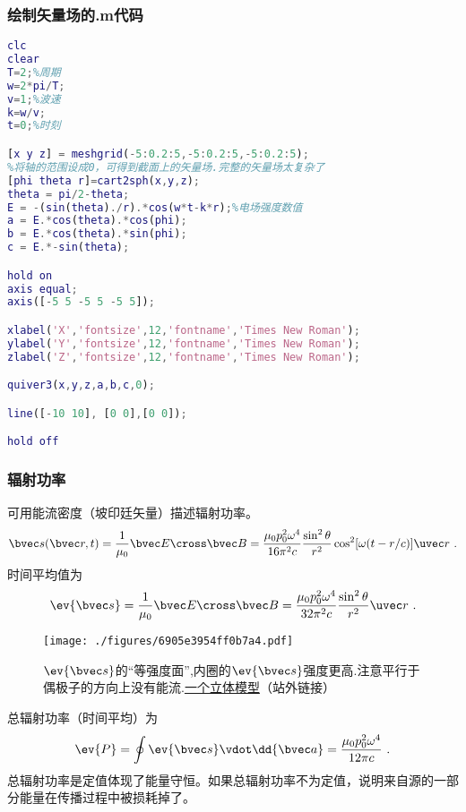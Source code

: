 \subsubsection{绘制矢量场的.m代码}
\begin{lstlisting}[language=matlab]
clc
clear
T=2;%周期
w=2*pi/T;
v=1;%波速
k=w/v;
t=0;%时刻

[x y z] = meshgrid(-5:0.2:5,-5:0.2:5,-5:0.2:5);
%将轴的范围设成0，可得到截面上的矢量场.完整的矢量场太复杂了
[phi theta r]=cart2sph(x,y,z);
theta = pi/2-theta;
E = -(sin(theta)./r).*cos(w*t-k*r);%电场强度数值
a = E.*cos(theta).*cos(phi);
b = E.*cos(theta).*sin(phi);
c = E.*-sin(theta);

hold on
axis equal;
axis([-5 5 -5 5 -5 5]);

xlabel('X','fontsize',12,'fontname','Times New Roman');
ylabel('Y','fontsize',12,'fontname','Times New Roman');
zlabel('Z','fontsize',12,'fontname','Times New Roman');

quiver3(x,y,z,a,b,c,0);

line([-10 10], [0 0],[0 0]);

hold off

\end{lstlisting}


\subsubsection{辐射功率}
可用能流密度（坡印廷矢量）描述辐射功率。
\begin{equation}
\bvec s(\bvec r, t) = \frac{1}{\mu_0} \bvec E \cross \bvec B = \frac{\mu_0p_0^2\omega^4}{16\pi^2c} \frac{\sin^2\theta}{r^2} \cos^2[\omega(t - r/c)] \uvec r~.
\end{equation}
时间平均值为
\begin{equation}
\ev{\bvec s} = \frac{1}{\mu_0} \bvec E \cross \bvec B
= \frac{\mu_0p_0^2\omega^4}{32\pi^2c} \frac{\sin^2\theta}{r^2} \uvec r~.
\end{equation}

\begin{figure}[ht]
\centering
\texttt{[image: ./figures/6905e3954ff0b7a4.pdf]}
\caption{$\ev{\bvec s}$的“等强度面”,内圈的$\ev{\bvec s}$强度更高.注意平行于偶极子的方向上没有能流.\href{https://www.geogebra.org/m/semmtxm5}{一个立体模型}（站外链接）} \label{fig_DipRad_2}
\end{figure}
总辐射功率（时间平均）为
\begin{equation}
\ev{P} = \oint \ev{\bvec s} \vdot \dd{\bvec a} = \frac{\mu_0 p_0^2 \omega^4}{12\pi c}~.
\end{equation}
总辐射功率是定值体现了能量守恒。如果总辐射功率不为定值，说明来自源的一部分能量在传播过程中被损耗掉了。
